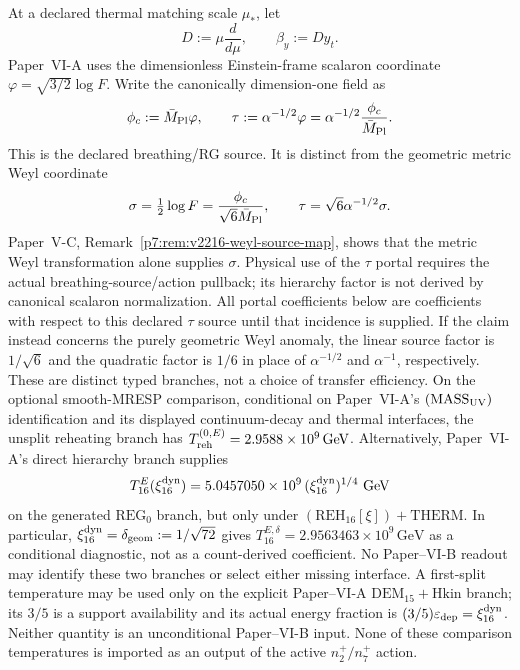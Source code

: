 \documentclass[12pt,a4paper]{article}
\begin{document}
\begin{definition}
\label{p9:def:portal-matching-data}
At a declared thermal matching scale \(\mu_*\), let
\[
D:=\mu\frac{d}{d\mu},\qquad \beta_y:=Dy_t.
\]
Paper~VI-A uses the dimensionless Einstein-frame scalaron coordinate
\(\varphi=\sqrt{3/2}\log F\).  Write the canonically dimension-one field as
\[
\phi_c:=\bar M_{\rm Pl}\varphi,
\qquad
\tau:=\alpha^{-1/2}\varphi
      =\alpha^{-1/2}\frac{\phi_c}{\bar M_{\rm Pl}}.
\]
This is the declared breathing/RG source.  It is distinct from the
geometric metric Weyl coordinate
\[
 \sigma=\tfrac12\log F=\frac{\phi_c}{\sqrt6\bar M_{\rm Pl}},
 \qquad \tau=\sqrt6\alpha^{-1/2}\sigma.
\]
Paper~V-C, Remark~\ref{p7:rem:v2216-weyl-source-map}, shows that the
metric Weyl transformation alone supplies $\sigma$.  Physical use of
the $\tau$ portal requires the actual breathing-source/action pullback;
its hierarchy factor is not derived by canonical scalaron normalization.
All portal coefficients below are coefficients with respect to this
declared $\tau$ source until that incidence is supplied.  If the claim
instead concerns the purely geometric Weyl anomaly, the linear source
factor is $1/\sqrt6$ and the quadratic factor is $1/6$ in place of
$\alpha^{-1/2}$ and $\alpha^{-1}$, respectively.  These are distinct
typed branches, not a choice of transfer efficiency.
On the optional smooth-MRESP comparison, conditional on Paper~VI-A's
\((\mathrm{MASS}_{\rm UV})\) identification and its displayed
continuum-decay and thermal interfaces, the unsplit reheating branch has
\(T_{\rm reh}^{(0,E)}=2.9588\times10^9\,\mathrm{GeV}\).  Alternatively,
Paper~VI-A's direct hierarchy branch supplies
\[
 T_{16}^{E}(\xi_{16}^{\rm dyn})
 =5.0457050\times10^9\,(\xi_{16}^{\rm dyn})^{1/4}\ {\rm GeV}
\]
on the generated \(\mathrm{REG}_0\) branch, but only under
\((\mathrm{REH}_{16}[\xi])+\mathrm{THERM}\).  In particular,
\(\xi_{16}^{\rm dyn}=\delta_{\rm geom}:=1/\sqrt{72}\) gives
\(T_{16}^{E,\delta}=2.9563463\times10^9\,\mathrm{GeV}\) as a conditional
diagnostic, not as a count-derived coefficient.  No Paper--VI-B readout may
identify these two branches or select either missing interface.  A
first-split temperature may be used only on the explicit Paper--VI-A
\(\mathrm{DEM}_{15}+\mathrm{Hkin}\) branch; its \(3/5\) is a support
availability and its actual energy fraction is
\((3/5)\varepsilon_{\rm dep}=\xi_{16}^{\rm dyn}\).  Neither quantity is an
unconditional Paper--VI-B input.  None of these comparison temperatures is
imported as an output of the active \(n_2^+/n_7^+\) action.
\end{definition}
\end{document}
